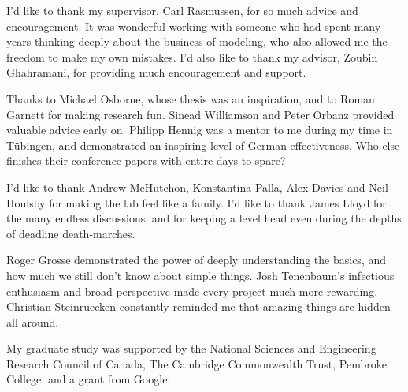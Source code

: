 
\begin{acknowledgements}      


I'd like to thank my supervisor, Carl Rasmussen, for so much advice and encouragement.
It was wonderful working with someone who had spent many years thinking deeply about the business of modeling, who also allowed me the freedom to make my own mistakes.
I'd also like to thank my advisor, Zoubin Ghahramani, for providing much encouragement and support.

Thanks to Michael Osborne, whose thesis was an inspiration, and to Roman Garnett for making research fun.
Sinead Williamson and Peter Orbanz provided valuable advice early on.
Philipp Hennig was a mentor to me during my time in T\"{u}bingen, and demonstrated an inspiring level of German effectiveness.  Who else finishes their conference papers with entire days to spare?

I'd like to thank Andrew McHutchon, Konstantina Palla, Alex Davies and Neil Houlsby for making the lab feel like a family.
I'd like to thank James Lloyd for the many endless discussions, and for keeping a level head even during the depths of deadline death-marches.

Roger Grosse demonstrated the power of deeply understanding the basics, and how much we still don't know about simple things.
Josh Tenenbaum's infectious enthusiasm and broad perspective made every project much more rewarding.
Christian Steinruecken constantly reminded me that amazing things are hidden all around.

My graduate study was supported by the National Sciences and Engineering Research Council of Canada, The Cambridge Commonwealth Trust, Pembroke College, and a grant from Google.

\end{acknowledgements}
